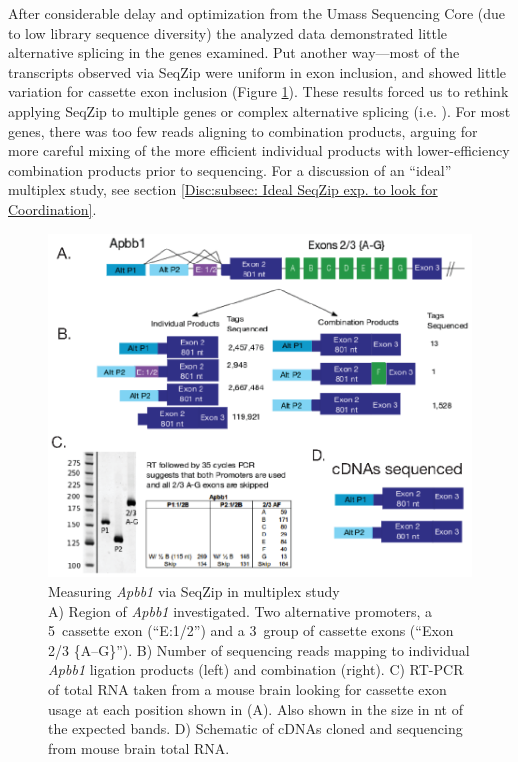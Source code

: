   After considerable delay and optimization from the Umass Sequencing Core (due to low library sequence diversity) the analyzed data demonstrated little alternative splicing in the genes examined. Put another way---most of the transcripts observed via SeqZip were uniform in exon inclusion, and showed little variation for cassette exon inclusion (Figure \ref{SeqZipMethod:fig:Apbb1 Results}). These results forced us to rethink applying SeqZip to multiple genes or complex alternative splicing (i.e. \dscam{}). For most genes, there was too few reads aligning to combination products, arguing for more careful mixing of the more efficient individual products with lower-efficiency combination products prior to sequencing. For a discussion of an ``ideal'' multiplex study, see section \ref{Disc:subsec: Ideal SeqZip exp. to look for Coordination}.

  \begin{figure} %
    \centering 
    \includegraphics{Figures/SeqZipMethod/Apbb1.eps}
    \caption[Measuring \textit{Apbb1} via SeqZip in multiplex study]
    {
      Measuring \textit{Apbb1} via SeqZip in multiplex study\\[0.25cm]
      A) Region of \textit{Apbb1} investigated. Two alternative promoters, a 5\textprime~cassette exon (``E:1/2'') and a 3\textprime~group of cassette exons (``Exon 2/3 \{A--G\}''). B) Number of sequencing reads mapping to individual \textit{Apbb1} ligation products (left) and combination (right). C) RT-PCR of total RNA taken from a mouse brain looking for cassette exon usage at each position shown in (A). Also shown in the size in nt of the expected bands. D) Schematic of cDNAs cloned and sequencing from mouse brain total RNA.
      }
    \label{SeqZipMethod:fig:Apbb1 Results}
    \end{figure}

